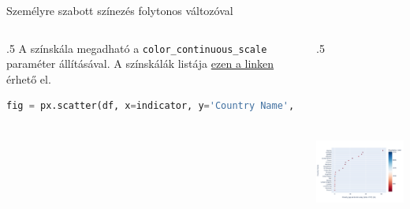 \documentclass[english, aspectratio=169]{beamer}
\begin{document}
	\begin{frame}[fragile]{Személyre szabott színezés folytonos változóval}
		\begin{columns}
			\begin{column}{.5\textwidth}
				A színskála megadható a \texttt{color\_continuous\_scale} paraméter állításával. A színskálák listája \href{https://plotly.com/python/builtin-colorscales/}{ezen a linken} érhető el.\par\medskip
				\begin{lstlisting}[language=python]
fig = px.scatter(df, x=indicator, y='Country Name', color='Population, total', color_continuous_scale='RdBu')				
				\end{lstlisting}
			\end{column}
			\begin{column}{.5\textwidth}
				\begin{center}
					\includegraphics[width=7cm, height=7cm, keepaspectratio]{images/scatter_10.png}
				\end{center}
			\end{column}
		\end{columns}
	\end{frame}
	
\end{document}
